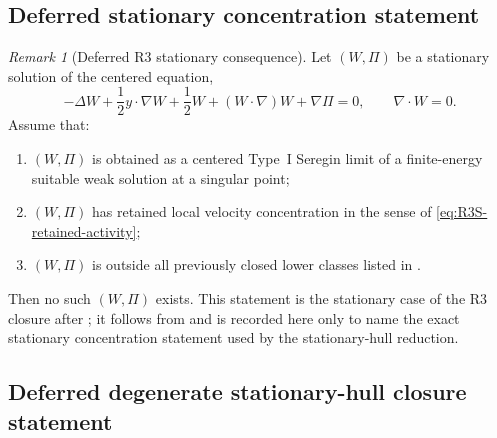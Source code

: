 \documentclass[11pt]{amsart}
\numberwithin{equation}{section}
\theoremstyle{plain}
\theoremstyle{definition}
\theoremstyle{remark}
\newtheorem{remark}[remark]{Remark}
\begin{document}
\subsection{Deferred stationary concentration statement}

\begin{remark}[Deferred R3 stationary consequence]
\label{thm:R3S-no-active-stationary-carrier}
Let \((W,\Pi)\) be a stationary solution of the centered equation,
\begin{equation}\label{eq:R3S-stationary-centered}
   -\Delta W+\frac12 y\cdot\nabla W+\frac12 W
   +(W\cdot\nabla)W+\nabla\Pi=0,
   \qquad \nabla\cdot W=0 .
\end{equation}
Assume that:
\begin{enumerate}[label=(\roman*)]
   \item \((W,\Pi)\) is obtained as a centered Type~I Seregin limit of a
   finite-energy suitable weak solution at a singular point;
   \item \((W,\Pi)\) has retained local velocity concentration in the sense of
   \eqref{eq:R3S-retained-activity};
   \item \((W,\Pi)\) is outside all previously closed lower classes listed in
   .
\end{enumerate}
Then no such \((W,\Pi)\) exists.  This statement is the stationary case of
the R3 closure after ; it follows from
 and is recorded here only to name the exact stationary
concentration statement used by the stationary-hull reduction.
\end{remark}

\subsection{Deferred degenerate stationary-hull closure statement}
\end{document}
